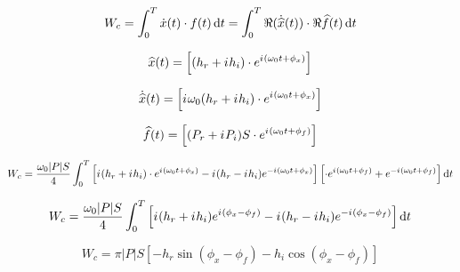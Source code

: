
\newcommand{\iu}{{i\mkern1mu}}
\newcommand{\expx}{\cdot e^{\iu(\omega_0 t + \phi_x)}}
\newcommand{\expf}{\cdot e^{\iu(\omega_0 t + \phi_f)}}

\begin{equation}
    W_c = \int_0^T \dot{x} (t) \cdot f(t) \mathop{}\!\mathrm{d} t 
        = \int_0^T \Re (\dot{\widehat{x}} (t)) \cdot \Re{\widehat{f}(t)} \mathop{}\!\mathrm{d} t
\end{equation}

\begin{equation}
    \widehat{x}(t) = \left[(h_r + \iu h_i) \expx \right]
\end{equation}

\begin{equation}
    \dot{\widehat{x}}(t) = \left[\iu \omega_0 (h_r + \iu h_ i) \expx \right]
\end{equation}

\begin{equation}
    \widehat{f}(t) = \left[(P_r + \iu P_i) S \expf  \right]
\end{equation}

\begin{equation}
    W_c = \frac{\omega_0 |P| S}{4} 
            \int_0^T \left[
                \iu (h_r + \iu h_i) \expx - 
                \iu (h_r - \iu h_i)  e^{- \iu(\omega_0 t + \phi_x)} \right]
            \left[
                \expf + e^{- \iu(\omega_0 t + \phi_f)} 
            \right] \diff t
\end{equation}

\begin{equation}
    W_c = \frac{\omega_0 |P| S}{4} 
            \int_0^T 
            \left[
                \iu (h_r + \iu h_i) e^{\iu(\phi_x - \phi_f)}
                - \iu (h_r - \iu h_i) e^{- \iu(\phi_x - \phi_f)}
            \right] \diff t
\end{equation}

\begin{equation}
    W_c = \pi |P| S 
            \left[
                - h_r \sin(\phi_x - \phi_f)
                - h_i \cos(\phi_x - \phi_f)
            \right]
\end{equation}